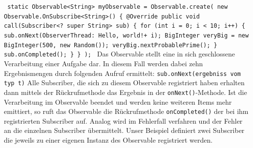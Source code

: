 \documentclass[12pt,oneside,a4paper,bibtotoc,liststotoc]{scrreprt}
\begin{document}
\texttt{\newline
static Observable<String> myObservable = Observable.create(\newline
           new Observable.OnSubscribe<String>() \{\newline
               @Override\newline
               public void call(Subscriber<? super String> sub) \{\newline
                   for (int i = 0; i < 10; i++)\newline
      \{\newline
                       sub.onNext(\grqq ObserverThread: Hello, world!\grqq + i);\newline
                       BigInteger veryBig = new BigInteger(500, new Random());\newline
                       veryBig.nextProbablePrime();\newline
                   \}\newline
                   sub.onCompleted();\newline
               \}\newline
           \}\newline
   );\newline
}\newline
Das Observable stellt eine in sich geschlossene Verarbeitung einer Aufgabe dar. In diesem Fall werden dabei zehn Ergebnismengen durch folgenden Aufruf ermittelt:\newline\newline
\texttt{sub.onNext(ergebniss vom typ t)}\newline
\newline
Alle Subscriber, die sich zu diesem Observable registriert haben erhalten dann mittels der Rückrufmethode das Ergebnis in der \texttt{onNext()}-Methode. Ist die Verarbeitung im Observable beendet und werden keine weiteren Items mehr emittiert, so ruft das Observable die Rückrufmethode \texttt{onCompleted()} der bei ihm registrierten Subscriber auf. Analog wird im Fehlerfall verfahren und der Fehler an die einzelnen Subscriber übermittelt. Unser Beispiel definiert zwei Subscriber die jeweils zu einer eigenen Instanz des Observable registriert werden.\newline
\end{document}
